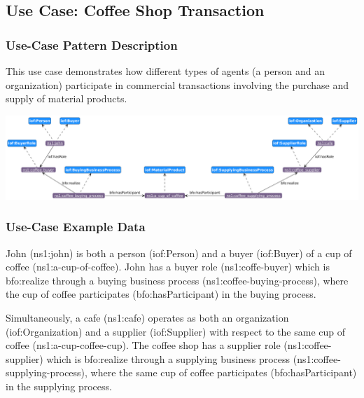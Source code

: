 \subsection*{Use Case: Coffee Shop Transaction}
\subsubsection*{Use-Case Pattern Description}
This use case demonstrates how different types of agents (a person and an organization) participate in commercial transactions involving the purchase and supply of material products.

\includegraphics[scale=0.35]{scenarios/different-type-agent/image/different-type-agent.png}

\subsubsection*{Use-Case Example Data}
John (ns1:john) is both a person (iof:Person) and a buyer (iof:Buyer) of a cup of coffee (ns1:a-cup-of-coffee). John has a buyer role (ns1:coffe-buyer) which is bfo:realize through a buying business process (ns1:coffee-buying-process), where the cup of coffee participates (bfo:hasParticipant) in the buying process.

Simultaneously, a cafe (ns1:cafe) operates as both an organization (iof:Organization) and a supplier (iof:Supplier) with respect to the same cup of coffee (ns1:a-cup-coffee-cup). The coffee shop has a supplier role (ns1:coffee-supplier) which is bfo:realize through a supplying business process (ns1:coffee-supplying-process), where the same cup of coffee participates (bfo:hasParticipant) in the supplying process.

\begin{table}[h]
\label{tab:organization-structure}
\begin{tabular}{|l|l|}
\hline

\hline
\end{tabular}%
\end{table}


